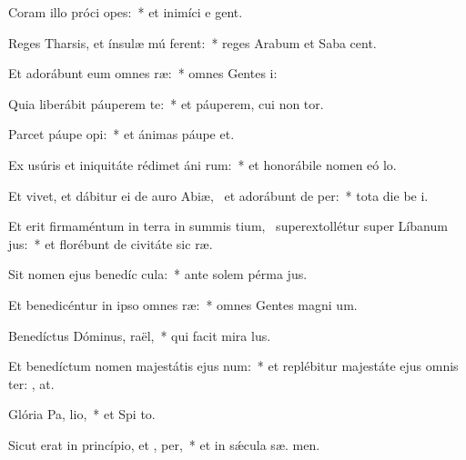 \item Coram illo próci opes:~* et inimíci e  gent.
\item Reges Tharsis, et ínsulæ mú ferent:~* reges Arabum et Saba  cent.
\item Et adorábunt eum omnes  ræ:~* omnes Gentes  i:
\item Quia liberábit páuperem  te:~* et páuperem, cui non  tor.
\item Parcet páupe  opi:~* et ánimas páupe  et.
\item Ex usúris et iniquitáte rédimet áni rum:~* et honorábile nomen eó  lo.
\item Et vivet, et dábitur ei de auro Abiæ,~\pscross{} et adorábunt de  per:~* tota die be i.
\item Et erit firmaméntum in terra in summis tium,~\pscross{} superextollétur super Líbanum  jus:~* et florébunt de civitáte sic  ræ.
\item Sit nomen ejus benedíc  cula:~* ante solem pérma  jus.
\item Et benedicéntur in ipso omnes  ræ:~* omnes Gentes magni um.
\item Benedíctus Dóminus,  raël,~* qui facit mira lus.
\item Et benedíctum nomen majestátis ejus  num:~* et replébitur majestáte ejus omnis ter: , at.
\item Glória Pa,  lio,~* et Spi to.
\item Sicut erat in princípio, et ,  per,~* et in sǽcula sæ. men.
